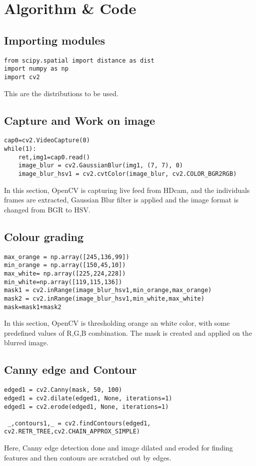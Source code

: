 \chapter{Algorithm \& Code}
\section{Importing modules}
\begin{lstlisting}
from scipy.spatial import distance as dist
import numpy as np
import cv2
\end{lstlisting}
This are the distributions to be used.

\section{Capture and Work on image}
\begin{lstlisting}
cap0=cv2.VideoCapture(0)
while(1):
	ret,img1=cap0.read()
	image_blur = cv2.GaussianBlur(img1, (7, 7), 0)
	image_blur_hsv1 = cv2.cvtColor(image_blur, cv2.COLOR_BGR2RGB)
\end{lstlisting}
In this section, OpenCV is capturing live feed from HDcam, and the individuals frames are extracted, Gaussian Blur filter is applied and the image format is changed from BGR to HSV.

\section{Colour grading}
\begin{lstlisting}
max_orange = np.array([245,136,99])
min_orange = np.array([150,45,10])
max_white= np.array([225,224,228])
min_white=np.array([119,115,136])
mask1 = cv2.inRange(image_blur_hsv1,min_orange,max_orange)
mask2 = cv2.inRange(image_blur_hsv1,min_white,max_white)
mask=mask1+mask2
\end{lstlisting}
In this section, OpenCV is thresholding orange an white color, with some predefined values of R,G,B combination. The mask is created and applied on the blurred image.

\section{Canny edge and Contour}
\begin{lstlisting}
edged1 = cv2.Canny(mask, 50, 100)
edged1 = cv2.dilate(edged1, None, iterations=1)
edged1 = cv2.erode(edged1, None, iterations=1)

 _,contours1,_ = cv2.findContours(edged1, cv2.RETR_TREE,cv2.CHAIN_APPROX_SIMPLE)
\end{lstlisting}
Here, Canny edge detection done and image dilated and eroded for finding features and then contours are scratched out by edges.

